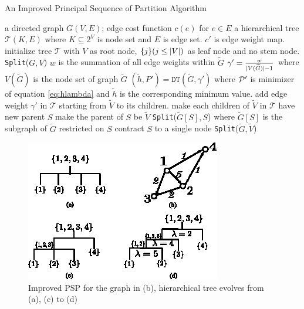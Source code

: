 \documentclass[runningheads]{llncs}
\begin{document}
\begin{algorithm}
	\caption{An Improved Principal Sequence of Partition Algorithm}\label{alg:psp_i_simplified}
	\begin{algorithmic}[1]
		\REQUIRE a directed graph $G(V, E)$; edge cost function $c(e)$ for $e\in E$
		\ENSURE a hierarchical tree $\mathcal{T}(K, E)$ where $K \subseteq 2^{V}$ is node set and $E$ is edge set. $c'$ is edge weight map.
		\STATE initialize tree $\mathcal{T}$ with $V$ as root node, $\{j\}(j\leq \abs{V})$ as leaf node and no stem node.
		\STATE \texttt{Split}($G, V$)
		\STATE $w$ is the summation of all edge weights within $\widetilde{G}$ 
		\STATE $\gamma' = \frac{w}{\abs{V(\widetilde{G})}-1}$ where $V(\widetilde{G})$ is the node set of graph $\widetilde{G}$
		\STATE $(\tilde{h}, P') = \texttt{DT}(\widetilde{G}, \gamma')$ where $\P'$ is minimizer of equation \eqref{eq:hlambda} and $\tilde{h}$ is the corresponding minimum value.  \label{alg:DT}
		\STATE add edge weight $\gamma'$ in $\mathcal{T}$ starting from $\widetilde{V}$ to its children.
		\ELSE
		\STATE make each children of $\widetilde{V}$ in $\mathcal{T}$ have new parent $S$		
		\STATE make the parent of $S$ be $\widetilde{V}$
		\STATE \texttt{Split}($\widetilde{G}[S], S$) where $\widetilde{G}[S]$ is the subgraph of $\widetilde{G}$ restricted on $S$
		\STATE contract $S$ to a single node %
		\ENDFOR 
		\STATE \texttt{Split}($\widetilde{G}, \widetilde{V}$)		
		\ENDIF
		\ENDFUNCTION
	\end{algorithmic}
\end{algorithm}
	
\begin{figure}[!ht]
	\includegraphics[width=\textwidth]{pic/alg_illustration.eps}
	\caption{Improved PSP for the graph in (b), hierarchical tree evolves from (a), (c) to (d) }\label{fig:alg_eg}
\end{figure}
\end{document}
